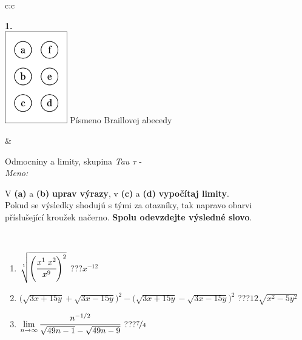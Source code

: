 \documentclass[10pt]{report}
\begin{document}
\begin{tabular}{c:c}
\begin{minipage}[c][104.5mm][t]{0.5\linewidth}
\begin{center}
\begin{minipage}{0.20\linewidth}
\begin{center}
{\Huge\bfseries 1.} \\[2mm]
\includegraphics[height=40mm]{../images/braille.png}
{\small Písmeno Braillovej abecedy}
\end{center}
\end{minipage}
\end{center}
\end{minipage}
&
\begin{minipage}[c][104.5mm][t]{0.5\linewidth}
\begin{center}
\vspace{7mm}
{\huge Odmocniny a limity, skupina \textit{Tau $\tau$} -}\\[5mm]
\textit{Meno:}\phantom{xxxxxxxxxxxxxxxxxxxxxxxxxxxxxxxxxxxxxxxxxxxxxxxxxxxxxxxxxxxxxxxxx}\\[5mm]
\begin{minipage}{0.95\linewidth}
\begin{center}
V \textbf{(a)} a \textbf{(b)} \textbf{uprav výrazy}, v \textbf{(c)} a \textbf{(d)} \textbf{vypočítaj limity}.\\Pokud se výsledky shodujú s tými za otazníky, tak napravo obarvi\\příslušející kroužek načerno. \textbf{Spolu odevzdejte výsledné slovo}.
\end{center}
\end{minipage}
\\[1mm]
\begin{minipage}{0.79\linewidth}
\begin{center}
\begin{varwidth}{\linewidth}
\begin{enumerate}
\small
\item $\sqrt[1]{\left(\cfrac{x^{1}\;x^{2}}{x^{9}}\right)^{2}}$\quad \dotfill\; ???\;\dotfill \quad $x^{-12}$
\item {\footnotesize{\scriptsize$\big(\sqrt{3x+15y}+\sqrt{3x-15y}\big)^2-\big(\sqrt{3x+15y}-\sqrt{3x-15y}\big)^2$}\quad \dotfill\; ???\;\dotfill \quad $12\sqrt{x^2-5y^2}$}
\item $\lim\limits_{n\to\infty}\cfrac{n^{-1/2}}{\sqrt{49n-1}-\sqrt{49n-9}}$\quad \dotfill\; ???\;\dotfill \quad $\nicefrac{7}{4}$

\end{enumerate}
\end{varwidth}
\end{center}
\end{minipage}
\end{center}
\end{minipage}
\end{tabular}
\end{document}
